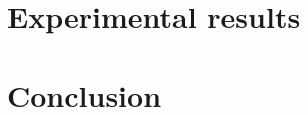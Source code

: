 \documentclass[runningheads]{llncs}
\begin{document}
\section{Experimental results}

\section{Conclusion}

%
%
%
% 
% 
%


\end{document}
